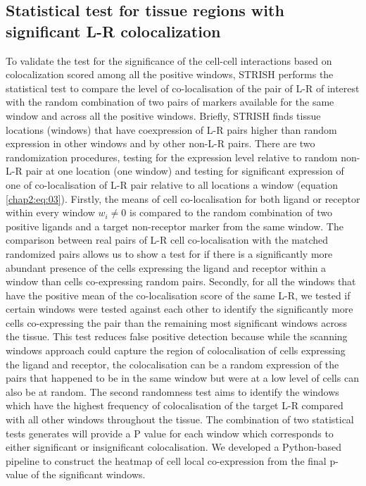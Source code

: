 \subsection{Statistical test for tissue regions with significant L-R colocalization}
To validate the test for the significance of the cell-cell interactions based on colocalization scored among all the positive windows, STRISH performs the statistical test to compare the level of co-localisation of the pair of L-R of interest with the random combination of two pairs of markers available for the same window and across all the positive windows. Briefly, STRISH finds tissue locations (windows) that have coexpression of L-R pairs higher than random expression in other windows and by other non-L-R pairs. There are two randomization procedures, testing for the expression level relative to random non-L-R pair at one location (one window) and testing for significant expression of one of co-localisation of L-R pair relative to all locations a window (equation \ref{chap2:eq:03}). Firstly, the means of cell co-localisation for both ligand or receptor within every window $w_i \neq 0$ is compared to the random combination of two positive ligands and a target non-receptor marker from the same window. The comparison between real pairs of L-R cell co-localisation with the matched randomized pairs allows us to show a test for if there is a significantly more abundant presence of the cells expressing  the ligand and receptor within a window than cells co-expressing random pairs. Secondly, for all the windows that have the positive mean of the co-localisation score of the same L-R, we tested if certain windows were tested against each other to identify the significantly more cells co-expressing the pair than the remaining  most significant windows across the tissue. This test reduces false positive detection because while the scanning windows approach could capture the region of colocalisation of cells expressing the ligand and receptor, the colocalisation can be a random expression of the pairs that happened to be in the same window but were at a low level of cells can also be at random. The second randomness test aims to identify the windows which have the highest frequency of colocalisation of the target L-R compared with all other windows throughout the tissue. The combination of two statistical tests generates will provide a P value for each window which corresponds to either significant or insignificant colocalisation. We developed a Python-based pipeline to construct the heatmap of cell local co-expression from the final p-value of the significant windows. 
